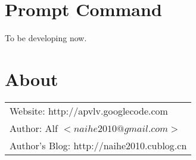 \documentclass[a4paper,12pt]{article}
\begin{document}
\newpage

\section{Prompt Command}

To be developing now.

\newpage

\section{About}

\large
\begin{tabular}{l}
Website: http://apvlv.googlecode.com \\
Author: Alf $<naihe2010@gmail.com>$ \\
Author's Blog: http://naihe2010.cublog.cn
\end{tabular}
\end{document}
